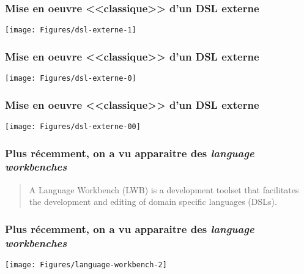 \begin{frame}
\frametitle{Mise en oeuvre <<classique>> d'un DSL externe}

\vfill
{\hspace*{-0.5cm}\texttt{[image: Figures/dsl-externe-1]}}

\vfill


\NOTE{\ }

\end{frame}



\begin{frame}
\frametitle{Mise en oeuvre <<classique>> d'un DSL externe}

\vfill
{\hspace*{-0.5cm}\texttt{[image: Figures/dsl-externe-0]}}

\vfill


\NOTE{\ }

\end{frame}

\begin{frame}
\frametitle{Mise en oeuvre <<classique>> d'un DSL externe}

\vfill
{\hspace*{-0.5cm}\texttt{[image: Figures/dsl-externe-00]}}

\vfill


\NOTE{\ }

\end{frame}

\begin{frame}
\frametitle{Plus r\'ecemment, on a vu apparaitre des \emph{language workbenches}}

\begin{quote}
A \alert{Language Workbench} (LWB) is a development toolset that facilitates
the development and editing of domain specific languages (DSLs). 

\bigskip

\end{quote}

\vfill
\NOTE{\ }

\end{frame}

\begin{frame}
\frametitle{Plus r\'ecemment, on a vu apparaitre des \emph{language workbenches}}

\vspace*{-0.6cm}

\begin{center}
{\texttt{[image: Figures/language-workbench-2]}}
\end{center}

\vfill


\end{frame}

